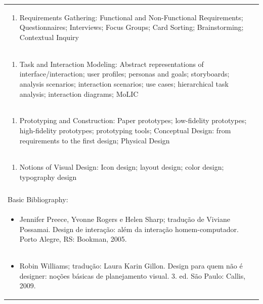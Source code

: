 \documentclass[11pt]{article}
\begin{document}
\begin{center}
\begin{longtable}{|p{4cm}|p{4cm}|p{4cm}|p{4cm}|}
\multicolumn{4}{|p{\dimexpr 16cm + 6\tabcolsep\relax}|}{\begin{enumerate}[start=2]\item Requirements Gathering: Functional and Non-Functional Requirements; Questionnaires; Interviews; Focus Groups; Card Sorting; Brainstorming; Contextual Inquiry\end{enumerate}}\\
\multicolumn{4}{|p{\dimexpr 16cm + 6\tabcolsep\relax}|}{\begin{enumerate}[start=3]\item Task and Interaction Modeling: Abstract representations of interface/interaction; user profiles; personas and goals; storyboards; analysis scenarios; interaction scenarios; use cases; hierarchical task analysis; interaction diagrams; MoLIC\end{enumerate}}\\
\multicolumn{4}{|p{\dimexpr 16cm + 6\tabcolsep\relax}|}{\begin{enumerate}[start=4]\item Prototyping and Construction: Paper prototypes; low-fidelity prototypes; high-fidelity prototypes; prototyping tools; Conceptual Design: from requirements to the first design; Physical Design\end{enumerate}}\\
\multicolumn{4}{|p{\dimexpr 16cm + 6\tabcolsep\relax}|}{\begin{enumerate}[start=5]\item Notions of Visual Design: Icon design; layout design; color design; typography design\end{enumerate}}\\
\multicolumn{4}{|p{\dimexpr 16cm + 6\tabcolsep\relax}|}{}\\
\hline
\multicolumn{4}{|p{16cm}|}{Basic Bibliography:}\\*
\multicolumn{4}{|p{\dimexpr 16cm + 6\tabcolsep\relax}|}{\begin{itemize}\item Jennifer Preece, Yvonne Rogers e Helen Sharp; tradução de Viviane Possamai. Design de interação: além da interação homem-computador. Porto Alegre, RS: Bookman, 2005.\end{itemize}}\\
\multicolumn{4}{|p{\dimexpr 16cm + 6\tabcolsep\relax}|}{\begin{itemize}\item Robin Williams; tradução: Laura Karin Gillon. Design para quem não é designer: noções básicas de planejamento visual. 3. ed. São Paulo: Callis, 2009.\end{itemize}}\\

\end{longtable}
\end{center}
\end{document}
